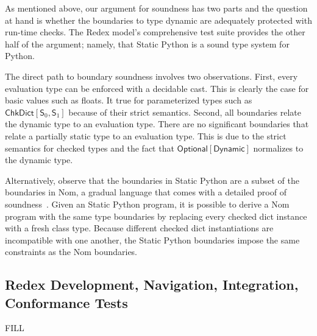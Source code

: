 \documentclass[english,cleveref,submission]{programming}
\newcommand{\SP}{Static Python}
\newcommand{\typefont}[1]{\mathsf{#1}}
\newcommand{\codefont}[1]{\emph{#1}}
\newcommand{\paramtype}[2]{#1[#2]}
\newcommand{\sptype}{\typefont{T}}
\newcommand{\spteval}{\typefont{S}}
\newcommand{\sptdyn}{\typefont{Dynamic}}
\newcommand{\sptoptional}[1]{\paramtype{\typefont{Optional}}{#1}}
\newcommand{\sptchkdict}[2]{\paramtype{\typefont{ChkDict}}{#1, #2}}
\newcommand{\spexpr}{\codefont{expr}}
\newcommand{\mfapply}[2]{#1\,(#2)}
\newcommand{\mffont}[1]{\mathit{#1}}
\newcommand{\mftypeF}[1]{\mfapply{\mffont{F}}{#1}}
\newcommand{\mfopt}[1]{\mfapply{\mffont{opt}}{#1}}
\newtheorem{theorem}{Theorem}
\begin{document}
As mentioned above, our argument for soundness has two parts
and the question at hand is whether the boundaries to type dynamic
are adequately protected with run-time checks.
The Redex model's comprehensive test suite provides the other half of the
argument; namely, that \SP{} is a sound type system for Python.

The direct path to boundary soundness involves two observations.
First, every evaluation type can be enforced with a decidable cast.
This is clearly the case for basic values such as floats.
It true for parameterized types such as $\sptchkdict{\spteval_0}{\spteval_1}$
because of their strict semantics.
Second, all boundaries relate the dynamic type to an evaluation type.
There are no significant boundaries that relate a partially static type
to an evaluation type.
This is due to the strict semantics for checked types and the fact that
$\sptoptional{\sptdyn}$ normalizes to the dynamic type.

Alternatively, observe that the boundaries in \SP{} are a subset
of the boundaries in Nom, a gradual language that comes with a detailed
proof of soundness~\cite{mt-oopsla-2017,mt-oopsla-2021}.
Given an \SP{} program, it is possible to derive a Nom program with
the same type boundaries by replacing every checked dict instance
with a fresh class type.
Because different checked dict instantiations are incompatible with
one another, the \SP{} boundaries impose the same constraints as the Nom
boundaries.






\subsection{Redex Development, Navigation, Integration, Conformance Tests}

FILL
\end{document}
